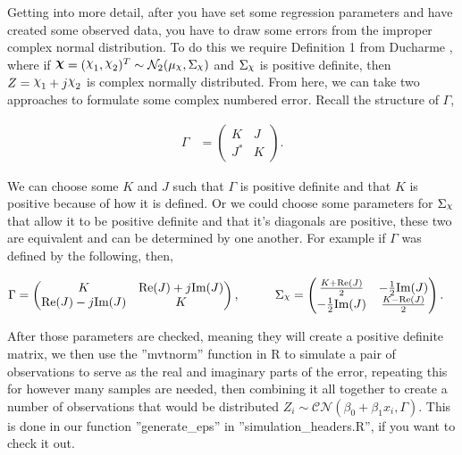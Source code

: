 \documentclass[honours,12pt]{unswthesis}
\DeclareRobustCommand{\Chi}{{\mathpalette\irchi\relax}}
\newcommand{\irchi}[2]{\raisebox{\depth}{$#1\chi$}} %
\numberwithin{equation}{section}
\begin{document}
\noindent Getting into more detail, after you have set some regression parameters and have created some observed data, you have to draw some errors from the improper complex normal distribution. To do this we require Definition 1 from Ducharme \cite{ducharme2016}, where if $\bm{\Chi} = (\Chi_{1}, \Chi_{2})^{T} \sim \mathcal{N}_{2} (\mu_{\Chi}, \Sigma_{\Chi})$ and $\Sigma_{\Chi}$ is positive definite, then $Z = \Chi_{1} + j \Chi_{2}$ is complex normally distributed. From here, we can take two approaches to formulate some complex numbered error. Recall the structure of $\Gamma$,

\begin{align*}
	\Gamma &= \begin{pmatrix}
		K & J \\
		J^{*} & K
	\end{pmatrix}.
\end{align*}

\noindent We can choose some $K$ and $J$ such that $\Gamma$ is positive definite and that $K$ is positive because of how it is defined. Or we could choose some parameters for $\Sigma_{\Chi}$ that allow it to be positive definite and that it's diagonals are positive, these two are equivalent and can be determined by one another. For example if $\Gamma$ was defined by the following, then,

\begin{align*}
	\Gamma &= \begin{pmatrix}
		K & \text{Re}(J) + j \text{Im}(J) \\
		\text{Re}(J) - j \text{Im}(J) & K
	\end{pmatrix}, \hspace{1cm}
	\Sigma_{\Chi} = \begin{pmatrix}
		\frac{K + \text{Re}(J)}{2} & -\frac{1}{2} \text{Im}(J) \\
		-\frac{1}{2} \text{Im}(J) & \frac{K - \text{Re}(J)}{2}
	\end{pmatrix}.
\end{align*}

\noindent After those parameters are checked, meaning they will create a positive definite matrix, we then use the ''mvtnorm'' function in R to simulate a pair of observations to serve as the real and imaginary parts of the error, repeating this for however many samples are needed, then combining it all together to create a number of observations that would be distributed $Z_{i} \sim \mathcal{CN} ( \beta_{0} + \beta_{1} x_{i}, \Gamma)$. This is done in our function ''generate\_eps'' in ''simulation\_headers.R'', if you want to check it out.
\end{document}
